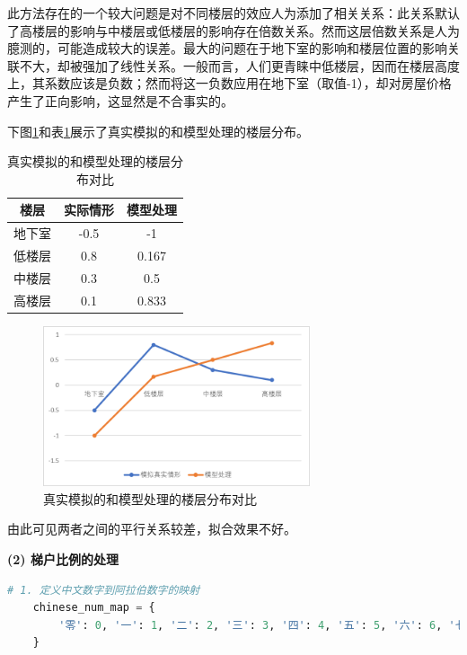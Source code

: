 \documentclass[
    report,     %
    oneside,    %
    UTF8,       %
    zihao=-4    %
]{config} %
\begin{document}
此方法存在的一个较大问题是对不同楼层的效应人为添加了相关关系：此关系默认了高楼层的影响与中楼层或低楼层的影响存在倍数关系。然而这层倍数关系是人为臆测的，可能造成较大的误差。最大的问题在于地下室的影响和楼层位置的影响关联不大，却被强加了线性关系。一般而言，人们更青睐中低楼层，因而在楼层高度上，其系数应该是负数；然而将这一负数应用在地下室（取值-1），却对房屋价格产生了正向影响，这显然是不合事实的。

下图\ref{fig:floor_distribution}和表\ref{tab:floor_effect}展示了真实模拟的和模型处理的楼层分布。

\begin{table}[htbp]
    \centering
    \caption{真实模拟的和模型处理的楼层分布对比}
    \label{tab:floor_effect}
    \begin{tabular}{ccc}
        \toprule
        楼层 & 实际情形 & 模型处理 \\
        \midrule
        地下室 & -0.5 & -1 \\
        低楼层 & 0.8 & 0.167 \\
        中楼层 & 0.3 & 0.5 \\
        高楼层 & 0.1 & 0.833 \\
        \bottomrule
    \end{tabular}
\end{table}

\begin{figure}[H]
    \centering
    \includegraphics[width=0.7\textwidth]{figures/楼层.png}
    \caption{真实模拟的和模型处理的楼层分布对比}
    \label{fig:floor_distribution}
\end{figure}

由此可见两者之间的平行关系较差，拟合效果不好。

\textbf{(2) 梯户比例的处理}

\begin{lstlisting}[label=code:ratio_mapping, language=Python, caption=梯户比例的处理-中文数字到阿拉伯数字映射字典]
    # 1. 定义中文数字到阿拉伯数字的映射
    chinese_num_map = {
        '零': 0, '一': 1, '二': 2, '三': 3, '四': 4, '五': 5, '六': 6, '七': 7, '八': 8, '九': 9, '十': 10, '百': 100, '千': 1000, '万': 10000
    }
\end{lstlisting}
\end{document}
